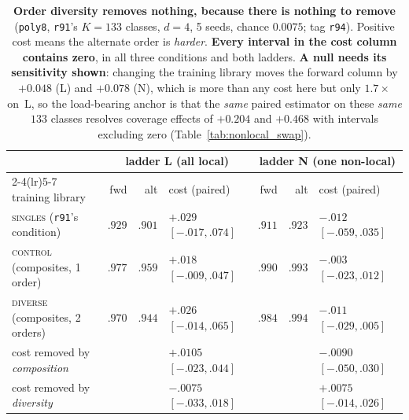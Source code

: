 \begin{table}[h]
\centering
\begin{threeparttable}
\footnotesize
\caption{\textbf{Order diversity removes nothing, because there is nothing to remove} (\texttt{poly8}, \texttt{r91}'s $K{=}133$ classes, $d{=}4$, 5 seeds, chance $0.0075$; tag \texttt{r94}). Positive cost means the alternate order is \emph{harder}. \textbf{Every interval in the cost column contains zero}, in all three conditions and both ladders. \textbf{A null needs its sensitivity shown}: changing the training library moves the forward column by $+0.048$ (L) and $+0.078$ (N), which is more than any cost here but only $1.7\times$ on~L, so the load-bearing anchor is that the \emph{same} paired estimator on these \emph{same} $133$ classes resolves coverage effects of $+0.204$ and $+0.468$ with intervals excluding zero (Table~\ref{tab:nonlocal_swap}).}
\label{tab:order_diversity}
\setlength{\tabcolsep}{3.5pt}
\begin{tabular}{@{}l rrl rrl@{}}
\toprule
& \multicolumn{3}{c}{ladder L (all local)} & \multicolumn{3}{c}{ladder N (one non-local)} \\
\cmidrule(lr){2-4}\cmidrule(lr){5-7}
training library & fwd & alt & cost (paired) & fwd & alt & cost (paired) \\
\midrule
\textsc{singles} \;(\texttt{r91}'s condition) & $.929$ & $.901$ & $+.029$ $[-.017,.074]$ & $.911$ & $.923$ & $-.012$ $[-.059,.035]$ \\
\textsc{control} \;(composites, 1 order) & $.977$ & $.959$ & $+.018$ $[-.009,.047]$ & $.990$ & $.993$ & $-.003$ $[-.023,.012]$ \\
\textsc{diverse} \;(composites, 2 orders) & $.970$ & $.944$ & $+.026$ $[-.014,.065]$ & $.984$ & $.994$ & $-.011$ $[-.029,.005]$ \\
\midrule
cost removed by \emph{composition} & & & $+.0105$ $[-.023,.044]$ & & & $-.0090$ $[-.050,.030]$ \\
cost removed by \emph{diversity} & & & $-.0075$ $[-.033,.018]$ & & & $+.0075$ $[-.014,.026]$ \\
\bottomrule
\end{tabular}
\end{threeparttable}
\end{table}

